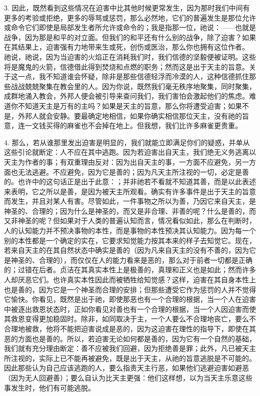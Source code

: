 3. 因此，既然看到这些情况在迫害中比其他时候更常发生，因为那时我们中间有更多的考验或拒绝，更多的辱骂或惩罚，那么必然地，它们的普遍发生是那位允许或命令它们即使是局部发生者所允许或命令的；我是指那一位，祂说：——也就是战争，因为那是和平的对立面。但我们的和平还有什么别的战争，除了迫害？如果在其结果上，迫害强有力地带来生或死，创伤或医治，那么你也拥有这位作者。 祂说，祂说，因为当迫害的火焰正在消耗我们时，我们信德的坚毅便被证明。这些将是魔鬼的火箭，信德借此得到焚烧和点燃的职务；然而这是出于天主的旨意。关于这一点，我不知道谁会怀疑，除非是那些信德轻浮而冷漠的人，这种信德抓住那些战战兢兢聚集在教会里的人。因为你说，既然我们毫无秩序地聚集，同时聚集，成群地涌入教会，外邦人便会被引导来查问我们，我们害怕会激起他们的焦虑。难道你不知道天主是万有的主吗？如果是天主的旨意，那么你将遭受迫害；如果不是，外邦人就会安静。要最确定地相信，如果你确实相信那位天主，没有祂的旨意，连一文钱买得的麻雀也不会掉在地上。但我想，我们比许多麻雀更贵重。\par

4. 那么，若从谁那里发出迫害是明显的，我们就能立即满足你们的疑惑，并单从这些引论就断定：人不应在其中逃跑。因为若迫害出自天主，我们绝无义务逃离以天主为作者的事；有双重理由反对：因为出自天主的事，一方面不应避免，另一方面也无法逃避。不应避免，因为它是善的；因为凡天主所注视的一切，必定是善的。也许中的这句话正是出于此意：；并非祂若不看就不知道其善，而是以此表述来表明，它之所以是善，是因为被天主所观看。确实有许多事件是出于天主的旨意而发生，并且对某人有害。尽管如此，一件事物之所以为善，乃因它来自天主，是神圣的、合理的；因为什么是神圣的，而又是非合理、非善的呢？什么是善的，而又非神圣的呢？但如果对于人类的普遍认知而言，情况看似如此，那么在判断时，人的认知能力并不预决事物的本性，而是事物的本性预决其认知能力。因为每一个别的本性都是一个确定的实在，它要求知觉能力按其本来的样子去知觉它。现在，若来自天主的在其自然状态中确实是善的（因为凡来自天主的没有不善的，因为它是神圣的、合理的），而仅仅在人的能力看来是恶的，那么对于前者一切都是正确的；过错在后者。贞洁在其真实本性上是极善的，真理和正义也是如此；然而许多人却厌恶它们。也许真实本性因此而被牺牲给知觉感？这样，迫害在其自身本性上也是善的，因为它是一个神圣而合理的安排；但那些遭受它作为惩罚的人并不觉得它愉快。你看见，既然是出于祂，即使那恶也有一个合理的根据，当一个人在迫害中被逐出救恩状态时，正如你看见对善也有一个合理的根据，当一个人因迫害而使其救恩变得更加稳固时。除非，如同取决于主，一个人要么不合理地丧亡，要么不合理地被救，他将不能把迫害说成是恶的，因为这迫害在理性的指导下，即使在其恶的方面也是善的。所以，若迫害无论如何都是善的，因为它有一个自然的基础，我们就有充分理由断定：善不应被我们回避，因为拒绝善是罪；此外，凡已被天主所注视的，实际上已不能再被避免，既是出于天主，从祂的旨意逃脱是不可能的。因此那些认为自己应该逃跑的人，要么指责天主行恶，如果他们逃避迫害如避恶（因为无人回避善）；要么自认为比天主更强：他们这样想，以为当天主乐意这些事发生时，他们有可能逃脱。\par

